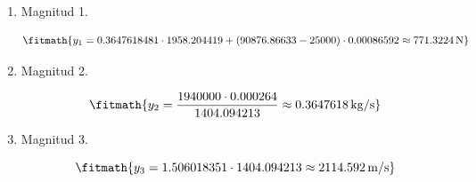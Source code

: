 \begin{enumerate}

\item Magnitud 1.

\[\fitmath{y_{1}=0.3647618481\cdot 1958.204419+\left(90876.86633-25000\right)\cdot 0.00086592\approx 771.3224\,\mathrm{N}}\]

\item Magnitud 2.

\[\fitmath{y_{2}=\frac{1940000\cdot 0.000264}{1404.094213}\approx 0.3647618\,\mathrm{kg/s}}\]

\item Magnitud 3.

\[\fitmath{y_{3}=1.506018351\cdot 1404.094213\approx 2114.592\,\mathrm{m/s}}\]

\end{enumerate}
